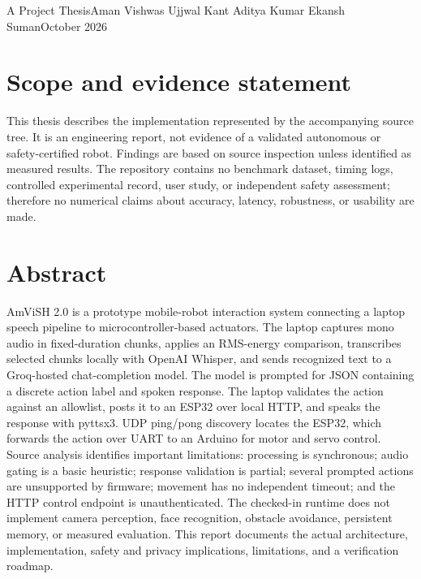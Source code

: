 \documentclass[12pt,a4paper]{report}
\begin{document}
\begin{titlepage}\centering\vspace*{1.5in}{\Large IMAGINATION INVENTORS\par}\vspace{1in}{\huge\bfseries AmViSH 2.0\par}\vspace{0.3in}{\Large Design and Implementation of a Speech-Driven Mobile Robot with Language-Model-Assisted Interaction\par}\vfill A Project Thesis\vfill Aman Vishwas \quad Ujjwal Kant \quad Aditya Kumar \quad Ekansh Suman\vfill October 2026\end{titlepage}
\chapter*{Scope and evidence statement}
This thesis describes the implementation represented by the accompanying source tree. It is an engineering report, not evidence of a validated autonomous or safety-certified robot. Findings are based on source inspection unless identified as measured results. The repository contains no benchmark dataset, timing logs, controlled experimental record, user study, or independent safety assessment; therefore no numerical claims about accuracy, latency, robustness, or usability are made.
\chapter*{Abstract}
AmViSH 2.0 is a prototype mobile-robot interaction system connecting a laptop speech pipeline to microcontroller-based actuators. The laptop captures mono audio in fixed-duration chunks, applies an RMS-energy comparison, transcribes selected chunks locally with OpenAI Whisper, and sends recognized text to a Groq-hosted chat-completion model. The model is prompted for JSON containing a discrete action label and spoken response. The laptop validates the action against an allowlist, posts it to an ESP32 over local HTTP, and speaks the response with pyttsx3. UDP ping/pong discovery locates the ESP32, which forwards the action over UART to an Arduino for motor and servo control. Source analysis identifies important limitations: processing is synchronous; audio gating is a basic heuristic; response validation is partial; several prompted actions are unsupported by firmware; movement has no independent timeout; and the HTTP control endpoint is unauthenticated. The checked-in runtime does not implement camera perception, face recognition, obstacle avoidance, persistent memory, or measured evaluation. This report documents the actual architecture, implementation, safety and privacy implications, limitations, and a verification roadmap.
\end{document}
